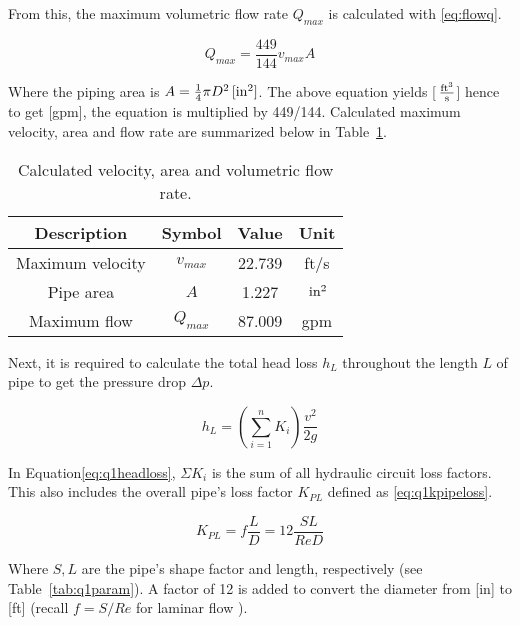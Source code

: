 From this, the maximum volumetric flow rate $Q_{max}$ is calculated with \ref{eq:flowq}.

\begin{equation}
	\label{eq:flowq}
	Q_{max} =  \frac{449}{144} v_{max} A	
\end{equation} 

Where the piping area is $ A = \frac{1}{4}\pi D^2 \,\mathrm{[in^2]}$. The above equation yields [$\,\mathrm{\frac{ft^3}{s}}$] hence to get [gpm], the equation is multiplied by 449/144. Calculated maximum velocity, area and flow rate are summarized below in Table~\ref{tab:q1ans1}.

\begin{table}[H]
  \centering
  \caption{Calculated velocity, area and volumetric flow rate.}
    \begin{tabular}{cccc}
    \toprule
    \textbf{Description} & \textbf{Symbol} & \textbf{Value } & \textbf{Unit} \\
    \midrule
    Maximum velocity	& $v_{max}$	& 22.739	& ft/s \\
    Pipe area 			& $A$     	& 1.227 	& $\,\mathrm{in^2}$ \\
    Maximum flow 		& $Q_{max}$	& 87.009 	& gpm \\
    \bottomrule
    \end{tabular}
  \label{tab:q1ans1}
\end{table}

Next, it is required to calculate the total head loss $h_L$ throughout the length $L$ of pipe to get the pressure drop $\Delta p$.

\begin{equation}
	\label{eq:q1headloss}	
	h_L = \left( \sum_{i=1}^{n} K_i \right) \frac{v^2}{2g} 
\end{equation}
 
In Equation\ref{eq:q1headloss}, $\Sigma K_i$ is the sum of all hydraulic circuit loss factors. This also includes the overall pipe's loss factor $K_{PL}$ defined as \ref{eq:q1kpipeloss}.

\begin{equation}
	\label{eq:q1kpipeloss}	
	K_{PL} = f \frac{L}{D} = 12 \frac{SL}{Re D}
\end{equation}

Where $S,L$ are the pipe's shape factor and length, respectively (see Table~\ref{tab:q1param}). A factor of 12 is added to convert the diameter from [in] to [ft] (recall $f=S/Re$ for laminar flow \cite{fluids}).\\

